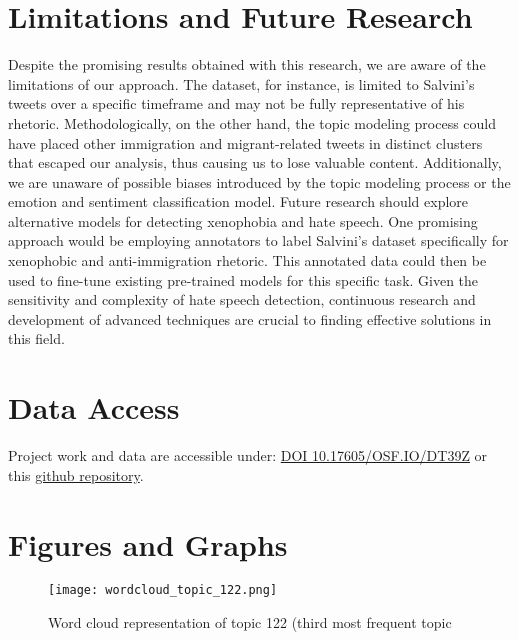 \documentclass[11pt]{article}
\begin{document}
\section{Limitations and Future Research}
Despite the promising results obtained with this research, we are aware of the limitations of our approach. The dataset, for instance, is limited to Salvini's tweets over a specific timeframe and may not be fully representative of his rhetoric. Methodologically, on the other hand, the topic modeling process could have placed other immigration and migrant-related tweets in distinct clusters that escaped our analysis, thus causing us to lose valuable content. Additionally, we are unaware of possible biases introduced by the topic modeling process or the emotion and sentiment classification model. Future research should explore alternative models for detecting xenophobia and hate speech. One promising approach would be employing annotators to label Salvini's dataset specifically for xenophobic and anti-immigration rhetoric. This annotated data could then be used to fine-tune existing pre-trained models for this specific task. Given the sensitivity and complexity of hate speech detection, continuous research and development of advanced techniques are crucial to finding effective solutions in this field.









\appendix

\section{Data Access}

Project work and data are accessible under: \href{https://osf.io/dt39z/}{DOI 10.17605/OSF.IO/DT39Z} or this \href{https://github.com/wtto1206/HATE-SALVINI/tree/main}{github repository}. 

\section{Figures and Graphs} \label{figures}

\begin{figure}[H]
    \centering
    \texttt{[image: wordcloud\_topic\_122.png]}
    \caption{Word cloud representation of topic 122 (third most frequent topic}
    \label{fig:topic122}
\end{figure}
\end{document}
